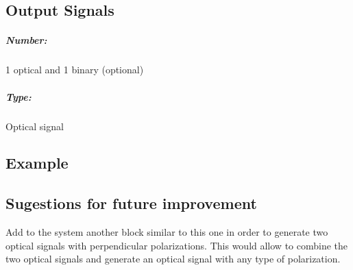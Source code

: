 \subsection*{Output Signals}

\subparagraph*{Number:} 1 optical and 1 binary (optional)

\subparagraph*{Type:} Optical signal

\subsection*{Example}



\subsection*{Sugestions for future improvement}

Add to the system another block similar to this one in order to generate two optical signals with perpendicular polarizations. This would allow to combine the two optical signals and generate an optical signal with any type of polarization.

